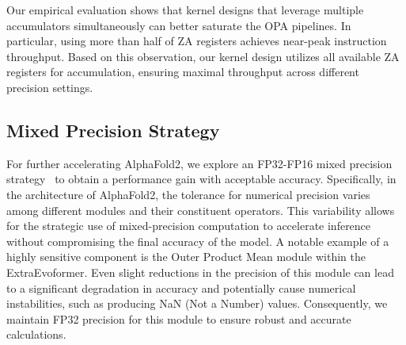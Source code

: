 Our empirical evaluation shows that kernel designs that leverage multiple accumulators simultaneously can better saturate the OPA pipelines. In particular, using more than half of ZA registers achieves near-peak instruction throughput. Based on this observation, our kernel design utilizes all available ZA registers for accumulation, ensuring maximal throughput across different precision settings.


\subsection{Mixed Precision Strategy}

For further accelerating AlphaFold2, we explore an FP32-FP16 mixed precision strategy~\cite{micikevicius2018mixed} to obtain a performance gain with acceptable accuracy.
Specifically, in the architecture of AlphaFold2, the tolerance for numerical precision varies among different modules and their constituent operators. This variability allows for the strategic use of mixed-precision computation to accelerate inference without compromising the final accuracy of the model. A notable example of a highly sensitive component is the Outer Product Mean module within the ExtraEvoformer. Even slight reductions in the precision of this module can lead to a significant degradation in accuracy and potentially cause numerical instabilities, such as producing NaN (Not a Number) values. Consequently, we maintain FP32 precision for this module to ensure robust and accurate calculations.

